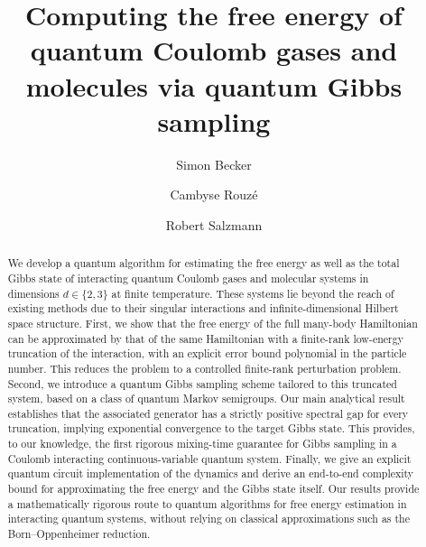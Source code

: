 \documentclass[11pt]{amsart}
\newcommand{\1}{\mathbbm{1}}
\theoremstyle{plain}
\theoremstyle{definition}
\theoremstyle{remark}
\numberwithin{equation}{section}
\begin{document}
\title[Gibbs sampling for Coulomb quantum gases]{Computing the free energy of quantum Coulomb gases and molecules via quantum Gibbs sampling}

\author{Simon Becker}
\address{Uni Bocconi, 20136, Milan, Italy}



\author{Cambyse Rouz\'e}
\address{Inria, T\'el\'ecom Paris -- LTCI, Institut Polytechnique de Paris, 91120 Palaiseau, France}

\author{Robert Salzmann}
\address{
Institute for Quantum Information, RWTH Aachen University, Germany}







\begin{abstract}
We develop a quantum algorithm for estimating the free energy as well as the total Gibbs state of interacting quantum Coulomb gases and molecular systems in dimensions $d \in \{2,3\}$ at finite temperature. These systems lie beyond the reach of existing methods due to their singular interactions and infinite-dimensional Hilbert space structure. First, we show that the free energy of the full many-body Hamiltonian can be approximated by that of the same Hamiltonian with a finite-rank low-energy truncation of the interaction, with an explicit error bound polynomial in the particle number. This reduces the problem to a controlled finite-rank perturbation problem. Second, we introduce a quantum Gibbs sampling scheme tailored to this truncated system, based on a class of quantum Markov semigroups. Our main analytical result establishes that the associated generator has a strictly positive spectral gap for every truncation, implying exponential convergence to the target Gibbs state. This provides, to our knowledge, the first rigorous mixing-time guarantee for Gibbs sampling in a Coulomb interacting continuous-variable quantum system. Finally, we give an explicit quantum circuit implementation of the dynamics and derive an end-to-end complexity bound for approximating the free energy and the Gibbs state itself. Our results provide a mathematically rigorous route to quantum algorithms for free energy estimation in interacting quantum systems, without relying on classical approximations such as the Born–Oppenheimer reduction.

\end{abstract}
\end{document}
